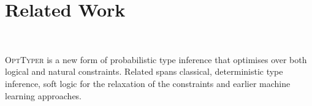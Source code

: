 \documentclass[acmsmall, review, anonymous]{acmart}\settopmatter{printfolios=true,printccs=false,printacmref=false}
\newcommand{\projectname}{\textsc{OptTyper}\xspace}
\newcommand{\margincomment}[2]{\marginpar{\scriptsize\color{Maroon}#1 says: #2}}
\newcommand{\cas}[1]{\margincomment{Charles}{#1}}
\begin{document}



\section{Related Work}~\label{sec:related}

\projectname is a new form of probabilistic type inference that optimises over
both logical and natural constraints.  Related spans classical, deterministic
type inference, soft logic for the relaxation of the constraints and earlier machine learning approaches.
\end{document}
